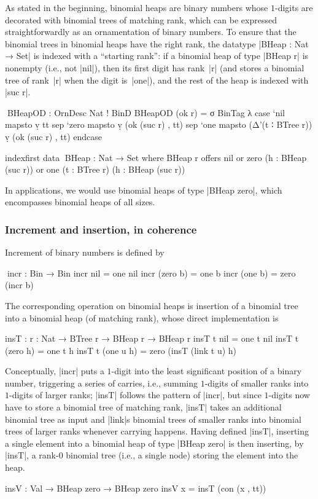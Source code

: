 As stated in the beginning, binomial heaps are binary numbers whose $1$-digits are decorated with binomial trees of matching rank, which can be expressed straightforwardly as an ornamentation of binary numbers.
To ensure that the binomial trees in binomial heaps have the right rank, the datatype |BHeap : Nat → Set| is indexed with a ``starting rank'': if a binomial heap of type |BHeap r| is nonempty (i.e., not |nil|), then its first digit has rank~|r| (and stores a binomial tree of rank~|r| when the digit is~|one|), and the rest of the heap is indexed with |suc r|.
\begin{code}
^^^BHeapOD : OrnDesc Nat ! BinD
BHeapOD (ok r) = σ BinTag λ  case  `nil   mapsto  ṿ tt
                             sep   `zero  mapsto  ṿ (ok (suc r) , tt)
                             sep   `one   mapsto  (Δ'(t ∶ BTree r)) ṿ (ok (suc r) , tt) endcase

indexfirst data ^^^BHeap : Nat → Set where
  BHeap r  offers  nil
           or      zero  (h : BHeap (suc r))
           or      one   (t : BTree r) (h : BHeap (suc r))
\end{code}
In applications, we would use binomial heaps of type |BHeap zero|, which encompasses binomial heaps of all sizes.

\subsubsection{Increment and insertion, in coherence}
Increment of binary numbers is defined by
\begin{code}
^^^incr : Bin → Bin
incr nil        =  one nil
incr (zero  b)  =  one b
incr (one   b)  =  zero (incr b)
\end{code}
The corresponding operation on binomial heaps is insertion of a binomial tree into a binomial heap (of matching rank), whose direct implementation is
\begin{code}
insT : {r : Nat} → BTree r → BHeap r → BHeap r
insT t nil         = one t nil
insT t (zero   h)  = one t h
insT t (one u  h)  = zero (insT (link t u) h)
\end{code}
Conceptually, |incr| puts a $1$-digit into the least significant position of a binary number, triggering a series of carries, i.e., summing $1$-digits of smaller ranks into $1$-digits of larger ranks; |insT| follows the pattern of |incr|, but since $1$-digits now have to store a binomial tree of matching rank, |insT| takes an additional binomial tree as input and |link|s binomial trees of smaller ranks into binomial trees of larger ranks whenever carrying happens.
Having defined |insT|, inserting a single element into a binomial heap of type |BHeap zero| is then inserting, by |insT|, a rank-$0$ binomial tree (i.e., a single node) storing the element into the heap.
\begin{code}
insV : Val → BHeap zero → BHeap zero
insV x = insT (con (x , tt))
\end{code}

